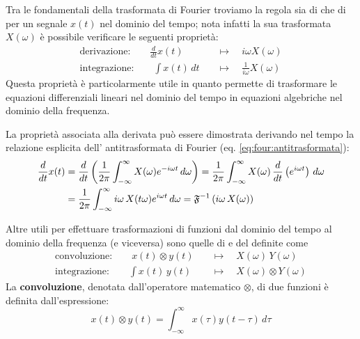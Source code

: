 		
		Tra le  fondamentali della trasformata di Fourier troviamo la regola sia di  che di  per un segnale $x(t)$ nel dominio del tempo; nota infatti la sua trasformata $X(\omega)$ è possibile verificare le seguenti proprietà:
		\begin{equation} \label{eq:four:derivata7}
			\begin{split}
				\textrm{derivazione:} \qquad \frac d{dt}x(t) \quad & \mapsto \quad i\omega X(\omega)\\
				\textrm{integrazione:} \qquad\int x(t)\, dt \quad & \mapsto \quad \frac 1 {i\omega} X(\omega)
			\end{split}
		\end{equation}
		Questa proprietà è particolarmente utile in quanto permette di trasformare le equazioni differenziali lineari nel dominio del tempo in equazioni algebriche nel dominio della frequenza.
		\begin{dimostrazione}
			La proprietà associata alla derivata può essere dimostrata derivando nel tempo la relazione esplicita dell' antitrasformata di Fourier (eq. \ref{eq:four:antitrasformata}):
			\begin{align*}
				\frac d {dt} x(t) & = \frac d {dt} \left(\frac 1 {2\pi} \int_{-\infty}^\infty  X(\omega) e^{-i\omega t}\, d\omega\right) = \frac 1{2\pi} \int_{-\infty}^\infty X(\omega) \, \frac d{dt}\left(e^{i\omega t}\right) \, d\omega \\ &  = \frac 1 {2\pi} \int_{-\infty}^\infty i\omega\, X(t\omega) e^{i\omega t}\, d\omega = \mathfrak F^{-1} \left(i\omega \, X(\omega)\right)
			\end{align*}
		\end{dimostrazione}
		
		Altre  utili per effettuare trasformazioni di funzioni dal dominio del tempo al dominio della frequenza (e viceversa) sono quelle di  e del  definite come 
		\begin{align*}
			\textrm{convoluzione:} \qquad x(t) \otimes y(t) \quad & \mapsto \quad X(\omega) \, Y(\omega)\\
			\textrm{integrazione:} \qquad\int x(t)\, y(t) \quad & \mapsto \quad X(\omega) \otimes Y(\omega)
		\end{align*}
		La \textbf{convoluzione}, denotata dall'operatore matematico $\otimes$, di due funzioni è definita dall'espressione:
		\[ x(t) \otimes y(t) = \int_{-\infty}^\infty x(\tau) y(t-\tau)\, d\tau  \]
		
